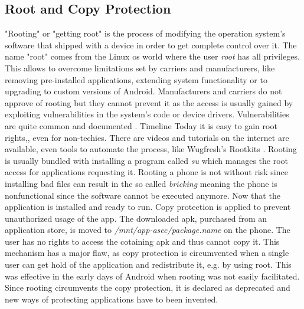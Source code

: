 \subsection{Root and Copy Protection} \label{subsection:android-copyroot}
"Rooting" or "getting root" is the process of modifying the operation system's software that shipped with a device in order to get complete control over it.
The name "root" comes from the Linux \gls{os} world where the user \textit{root} has all privileges.
This allows to overcome limitations set by carriers and manufacturers, like removing pre-installed applications, extending system functionality or to upgrading to custom versions of Android.
Manufacturers and carriers do not approve of rooting but they cannot prevent it as the access is usually gained by exploiting vulnerabilities in the system's code or device drivers.
Vulnerabilities are quite common and documented \cite{androidVulnerabilities}.
\cite{asdasd}
Timeline
\cite{asdasd}
Today it is easy to gain root rights,, even for non-techies.
There are videos and tutorials on the internet  are available, even tools to automate the process, like Wugfresh's Rootkits \cite{wugfresh}.
Rooting is usually bundled with installing a program called \textit{su} which manages the root access for applications requesting it.
Rooting a phone is not without risk since installing bad files can result in the so called \textit{bricking} meaning the phone is nonfunctional since the software cannot be executed anymore. \cite{androidpoliceRoot}
\newline
Now that the application is installed and ready to run.
Copy protection is applied to prevent unauthorized usage of the app.
The downloaded \gls{apk}, purchased from an application store, is moved to \textit{/mnt/app-asec/package.name} on the phone.
The user has no rights to access the cotaining \gls{apk} and thus cannot copy it.
This mechanism has a major flaw, as copy protection is circumvented when a single user can get hold of the application and redistribute it, e.g. by using root.
This was effective in the early days of Android when rooting was not easily facilitated.
\newline
Since rooting circumvents the copy protection, it is declared as deprecated and new ways of protecting applications have to been invented.
